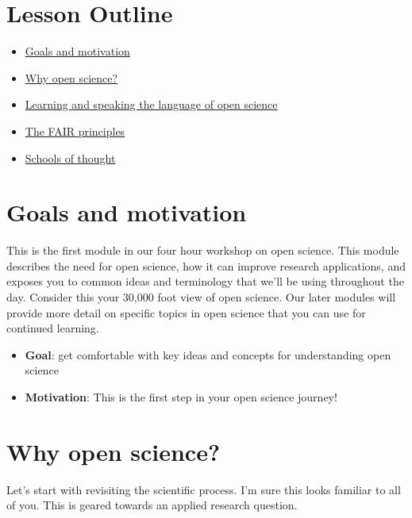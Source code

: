 \documentclass[
  letterpaper,
  DIV=11,
  numbers=noendperiod]{scrreprt}
\providecommand{\tightlist}{%
  \setlength{\itemsep}{0pt}\setlength{\parskip}{0pt}}\usepackage{longtable,booktabs,array}
\begin{document}
\hypertarget{lesson-outline}{%
\section{Lesson Outline}\label{lesson-outline}}

\begin{itemize}
\tightlist
\item
  \protect\hyperlink{goals-and-motivation-3}{Goals and motivation}
\item
  \protect\hyperlink{why-open-science}{Why open science?}
\item
  \protect\hyperlink{learning-and-speaking-the-language-of-open-science}{Learning
  and speaking the language of open science}
\item
  \protect\hyperlink{fair}{The FAIR principles}
\item
  \protect\hyperlink{schools}{Schools of thought}
\end{itemize}

\hypertarget{goals-and-motivation}{%
\section{Goals and motivation}\label{goals-and-motivation}}

This is the first module in our four hour workshop on open science. This
module describes the need for open science, how it can improve research
applications, and exposes you to common ideas and terminology that we'll
be using throughout the day. Consider this your 30,000 foot view of open
science. Our later modules will provide more detail on specific topics
in open science that you can use for continued learning.

\begin{itemize}
\tightlist
\item
  \textbf{Goal}: get comfortable with key ideas and concepts for
  understanding open science
\item
  \textbf{Motivation}: This is the first step in your open science
  journey!
\end{itemize}

\hypertarget{why-open-science}{%
\section{Why open science?}\label{why-open-science}}

Let's start with revisiting the scientific process. I'm sure this looks
familiar to all of you. This is geared towards an applied research
question.
\end{document}
